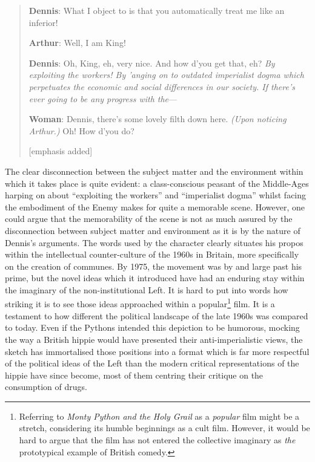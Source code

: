 \documentclass[
,a4paper
,DIV=12
,12pt
,abstract
,bibliography=totoc
]{scrartcl}
\begin{document}
\begin{quote}
  \textbf{Dennis}: What I object to is that you automatically treat me like an inferior!

  \textbf{Arthur}: Well, I am King!

  \textbf{Dennis}: Oh, King, eh, very nice. And how d'you get that, eh? \emph{By exploiting the workers! By 'anging on to outdated imperialist dogma which perpetuates the economic and social differences in our society. If there's ever going to be any progress with the}---

  \textbf{Woman}: Dennis, there's some lovely filth down here. \emph{(Upon noticing Arthur.)} Oh! How d'you do?

  [emphasis added]
\end{quote}
The clear disconnection between the subject matter and the environment within which it takes place is quite evident: a class-conscious peasant of the Middle-Ages harping on about \enquote{exploiting the workers} and \enquote{imperialist dogma} whilst facing the embodiment of the Enemy makes for quite a memorable scene.  However, one could argue that the memorability of the scene is not as much assured by the disconnection between subject matter and environment as it is by the nature of Dennis’s arguments.  The words used by the character clearly situates his propos within the intellectual counter-culture of the 1960s in Britain, more specifically on the creation of communes.  By 1975, the movement was by and large past his prime, but the novel ideas which it introduced have had an enduring stay within the imaginary of the non-institutional Left.  It is hard to put into words how striking it is to see those ideas approached within a popular\footnote{Referring to \emph{Monty Python and the Holy Grail} as a \emph{popular} film might be a stretch, considering its humble beginnings as a cult film.  However, it would be hard to argue that the film has not entered the collective imaginary as \emph{the} prototypical example of British comedy.} film.  It is a testament to how different the political landscape of the late 1960s was compared to today.  Even if the Pythons intended this depiction to be humorous, mocking the way a British hippie would have presented their anti-imperialistic views, the sketch has immortalised those positions into a format which is far more respectful of the political ideas of the Left than the modern critical representations of the hippie have since become, most of them centring their critique on the consumption of drugs.
\end{document}
